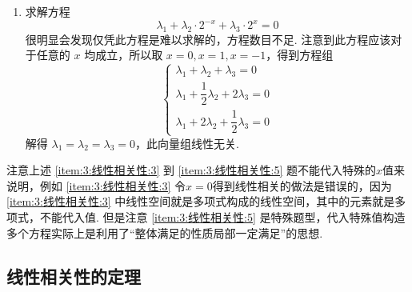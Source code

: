 \begin{solution}
\begin{enumerate}
        \item 求解方程
              \[\lambda_1 + \lambda_2·2^{-x} + \lambda_3·2^x = 0\]
              很明显会发现仅凭此方程是难以求解的，方程数目不足. 注意到此方程应该对于任意的 $x$ 均成立，所以取 $x = 0, x = 1, x = -1$，得到方程组
              \[ \begin{cases}
                      \lambda_1 + \lambda_2 + \lambda_3 = 0              \\[1ex]
                      \lambda_1 + \dfrac{1}{2}\lambda_2 + 2\lambda_3 = 0 \\[1ex]
                      \lambda_1 + 2\lambda_2 + \dfrac{1}{2}\lambda_3 = 0
                  \end{cases} \]
              解得 $\lambda_1 = \lambda_2 = \lambda_3 = 0$，此向量组线性无关.
    \end{enumerate}
\end{solution}
注意上述 \ref*{item:3:线性相关性:3} 到 \ref*{item:3:线性相关性:5} 题不能代入特殊的$x$值来说明，例如 \ref*{item:3:线性相关性:3} 令$x=0$得到线性相关的做法是错误的，因为\ref*{item:3:线性相关性:3} 中线性空间就是多项式构成的线性空间，其中的元素就是多项式，不能代入值. 但是注意 \ref*{item:3:线性相关性:5} 是特殊题型，代入特殊值构造多个方程实际上是利用了``整体满足的性质局部一定满足''的思想.

\subsection{线性相关性的定理}


